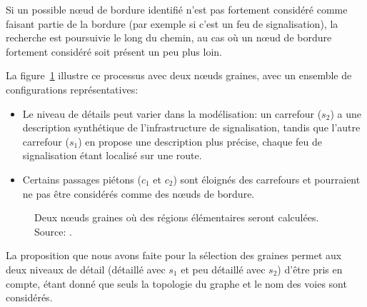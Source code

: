 \newpar{}

Si un possible nœud de bordure identifié n'est pas fortement considéré comme faisant partie de la bordure (par exemple si c'est un feu de signalisation), la recherche est poursuivie le long du chemin, au cas où un nœud de bordure fortement considéré soit présent un peu plus loin.

\newpar{}

La figure~\ref{fig:modelisation_boundarySelection} illustre ce processus avec deux nœuds graines, avec un ensemble de configurations représentatives: 

\begin{itemize}
    \item Le niveau de détails peut varier dans la modélisation: un carrefour ($s_2$) a une description synthétique de l'infrastructure de signalisation, tandis que l'autre carrefour ($s_1$) en propose une description plus précise, chaque feu de signalisation étant localisé sur une route.
    \item Certains passages piétons ($c_1$ et $c_2$) sont éloignés des carrefours et pourraient ne pas être considérés comme des nœuds de bordure.
\end{itemize}

\begin{figure}[ht]
    \centering
    \caption[Nœuds graines utilisés pour la segmentation de carrefour]{Deux nœuds graines où des régions élémentaires seront calculées. Source: \citep{Favreau2022}.}
    \label{fig:modelisation_boundarySelection}
\end{figure}

\newpar{}

La proposition que nous avons faite pour la sélection des graines permet aux deux niveaux de détail (détaillé avec $s_1$ et peu détaillé avec $s_2$) d'être pris en compte, étant donné que seuls la topologie du graphe et le nom des voies sont considérés.

\newpar{}

